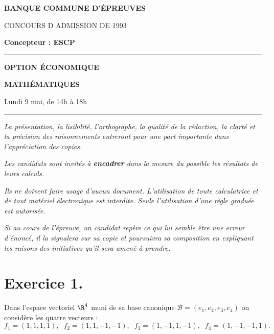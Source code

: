 \documentclass[11pt]{article}%
\begin{document}

\begin{center}
{\LARG\E\textbf{BANQUE COMMUNE D'ÉPREUVES}}



{\large \textsc{CONCOURS D ADMISSION DE 1993}}



{\large \textbf{Concepteur : ESCP}}



\rule{2.39cm}{0.05cm}



{\Large \textbf{OPTION ÉCONOMIQUE}}



{\Large \textbf{MATHÉMATIQUES }}



{\Large Lundi 9 mai, de 14h à 18h}



\rule{2.39cm}{0.05cm}
\end{center}

\textit{La présentation, la lisibilité, l'orthographe, la qualité
de la rédaction, la clarté et la précision des raisonnements
entreront pour une part importante dans l'appréciation des copies.}

\textit{Les candidats sont invités à \textbf{encadrer} dans la mesure
du possible les résultats de leurs calculs.}

\textit{Ils ne doivent faire usage d'aucun document. L'utilisation de
toute
calculatrice et de tout matériel électronique est interdite. Seule
l'utilisation d'une règle graduée est autorisée.}

\textit{Si au cours de l'épreuve, un candidat repère ce qui lui semble
être une erreur d'énoncé, il la signalera sur sa copie et
poursuivra sa composition en expliquant les raisons des initiatives
qu'il sera
amené à prendre.}

\vspace*{3cm}

\section*{Exercice 1.}

Dans l'espace vectoriel $\R^{4}$ muni de sa base canonique $\mathcal{B}
= (e_{1},e_{2},e_{3},e_{4})$ on considère les quatre vecteurs : 
\[
f_{1} = (1,1,1,1),\;\;f_{2} = (1,1,-1,-1),\;\;f_{3} =
(1,-1,1,-1),\;\;f_{4} = (1,-1,-1,1).
\]
\end{document}
